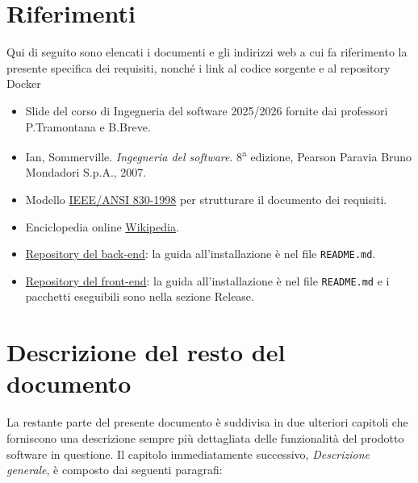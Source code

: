 \section{Riferimenti}
Qui di seguito sono elencati i documenti e gli indirizzi web a cui fa riferimento la presente specifica dei requisiti, nonché i 
link al codice sorgente e al repository Docker
\begin{itemize}
    \item Slide del corso di Ingegneria del software 2025/2026 fornite dai professori P.Tramontana e B.Breve.
    \item Ian, Sommerville. \textit{Ingegneria del software}. 8\textsuperscript{a} edizione, Pearson Paravia Bruno Mondadori S.p.A., 2007.
    \item Modello \href{https://ieeexplore.ieee.org/document/720574}{IEEE/ANSI 830-1998} per strutturare il documento dei requisiti.
    \item Enciclopedia online \href{https://it.wikipedia.org/wiki/Pagina_principale}{Wikipedia}. 
    \item \href{https://github.com/ubiestubi/ProgettoIngSoft}{Repository del back-end}: la guida
      all'installazione è nel file \texttt{README.md}.
    \item \href{https://github.com/GiandomenicoIameo/BugBoard26/}{Repository del front-end}: la guida
      all'installazione è nel file \texttt{README.md} e i pacchetti eseguibili sono nella sezione Release.
\end{itemize}

\section{Descrizione del resto del documento}
La restante parte del presente documento è suddivisa in due ulteriori capitoli che forniscono una descrizione sempre più dettagliata delle funzionalità del prodotto software in questione.
Il capitolo immediatamente successivo, \textit{Descrizione generale}, è composto dai seguenti paragrafi:

